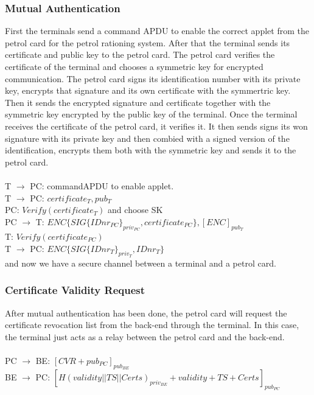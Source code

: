 \subsubsection{Mutual Authentication}
First the terminals send a command APDU to enable the correct applet from the petrol card for the petrol rationing system. After that the terminal sends its certificate and public key to the petrol card. The petrol card verifies the certificate of the terminal and chooses a symmetric key for encrypted communication. The petrol card signs its identification number with its private key, encrypts that signature and its own certificate with the symmertric key. Then it sends the encrypted signature and certificate together with the symmetric key encrypted by the public key of the terminal. Once the terminal receives the certificate of the petrol card, it verifies it. It then sends signs its won signature with its private key and then combied with a signed version of the identification, encrypts them both with the symmetric key and sends it to the petrol card.
\\
\\
T $\to$ PC: commandAPDU to enable applet.\\
T $\to$ PC: $certificate_{T}, pub_{T}$\\
PC: $Verify(certificate_{T})$ and choose SK\\
PC $\to$ T: $ENC\{SIG\{IDnr_{PC}\}_{priv_{PC}}, certificate_{PC}\},  [ENC]_{pub_T}$\\
T: $Verify(certificate_{PC})$\\
T $\to$ PC: $ENC\{SIG\{IDnr_{T}\}_{priv_T}, IDnr_{T}\}$ \\
and now we have a secure channel between a terminal and a petrol card.

\subsubsection{Certificate Validity Request}
After mutual authentication has been done, the petrol card will request the certificate revocation list from the back-end through the terminal. In this case, the terminal just acts as a relay between the petrol card and the back-end.
\\
\\
PC $\to$ BE: $[CVR + pub_{PC}]_{pub_{BE}}$\\
BE $\to$ PC: $[H(validity||TS||Certs)_{priv_{BE}}+validity+TS+Certs]_{pub_{PC}}$

